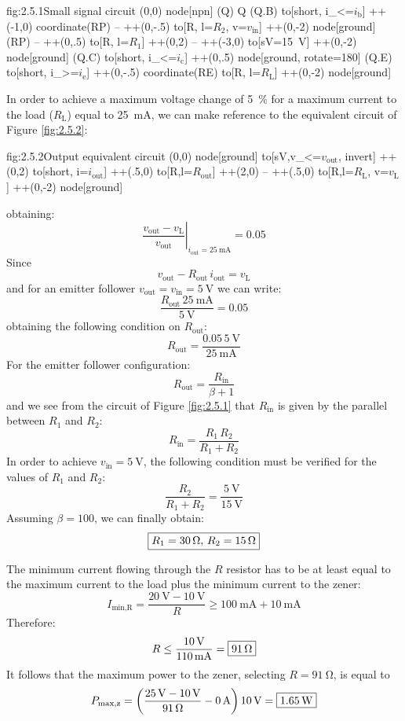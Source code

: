 \begin{circuit}{fig:2.5.1}{Small signal circuit}
    (0,0) node[npn] (Q) {Q}
    (Q.B) to[short, i_<=$i_\text{b}$] ++(-1,0) coordinate(RP)
    -- ++(0,-.5) 
    to[R, l=$R_2$, v=$v_\text{in}$] ++(0,-2)
    node[ground] {}
    (RP) -- ++(0,.5)
    to[R, l=$R_1$] ++(0,2)
    -- ++(-3,0)
    to[sV=\SI{15}{\volt}] ++(0,-2)
    node[ground] {}
    (Q.C) to[short, i_<=$i_\text{c}$] ++(0,.5) node[ground, rotate=180] {}
    (Q.E) to[short, i_>=$i_\text{e}$] ++(0,-.5) coordinate(RE)
    to[R, l=$R_\text{L}$] ++(0,-2)
    node[ground] {}
\end{circuit}

In order to achieve a maximum voltage change of \SI{5}{\percent} for a maximum current to the load ($R_\text{L}$) equal to \SI{25}{\milli\ampere}, we can make reference to the equivalent circuit of Figure \ref{fig:2.5.2}:
\begin{circuit}{fig:2.5.2}{Output equivalent circuit}
    (0,0) node[ground] {}
    to[sV,v_<=$v_\text{out}$, invert] ++(0,2)
    to[short, i=$i_\text{out}$] ++(.5,0)
    to[R,l=$R_\text{out}$] ++(2,0)
    -- ++(.5,0)
    to[R,l=$R_\text{L}$, v=$v_\text{L}$] ++(0,-2)
    node[ground] {}
\end{circuit}
obtaining:
\[\left.\frac{v_\text{out}-v_\text{L}}{v_\text{out}}\right\rvert_{i_\text{out}=\SI{25}{\milli\ampere}}=0.05\]
Since
\[v_\text{out}-R_\text{out}\,i_\text{out}=v_\text{L}\]
and for an emitter follower $v_\text{out}=v_\text{in}=\SI{5}{\volt}$
we can write:
\[\frac{R_\text{out}\,\SI{25}{\milli\ampere}}{\SI{5}{\volt}}=0.05\]
obtaining the following condition on $R_\text{out}$:
\[R_\text{out}=\frac{0.05\,\SI{5}{\volt}}{\SI{25}{\milli\ampere}}\]
For the emitter follower configuration:
\[R_\text{out}=\frac{R_\text{in}}{\beta+1}\]
and we see from the circuit of Figure \ref{fig:2.5.1} that $R_\text{in}$ is given by the parallel between $R_\text{1}$ and $R_\text{2}$:
\[R_\text{in}=\frac{R_\text{1}\,R_\text{2}}{R_\text{1}+R_\text{2}}\]
In order to achieve $v_\text{in}=\SI{5}{\volt}$, the following condition must be verified for the values of $R_\text{1}$ and $R_\text{2}$:
\[\frac{R_\text{2}}{R_\text{1}+R_\text{2}}=\frac{\SI{5}{\volt}}{\SI{15}{\volt}}\]
Assuming $\beta=100$, we can finally obtain:
\[\boxed{R_\text{1}=\SI{30}{\ohm},\,R_\text{2}=\SI{15}{\ohm}}\]


The minimum current flowing through the $R$ resistor has to be at least equal to the maximum current to the load plus the minimum current to the zener:
\[I_\text{min,R}=\frac{\SI{20}{\volt}-\SI{10}{\volt}}{R}\geq\SI{100}{\milli\ampere}+\SI{10}{\milli\ampere}\]
Therefore:
\[R\leq \frac{\SI{10}{\volt}}{\SI{110}{\milli\ampere}}=\boxed{\SI{91}{\ohm}}\]
It follows that the maximum power to the zener, selecting $R=\SI{91}{\ohm}$, is equal to
\[P_\text{max,z}=\left(\frac{\SI{25}{\volt}-\SI{10}{\volt}}{\SI{91}{\ohm}}-\SI{0}{\ampere}\right)\SI{10}{\volt}=\boxed{\SI{1.65}{\watt}}\]


